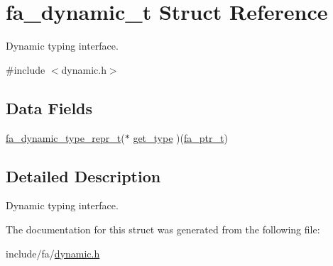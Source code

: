 \hypertarget{structfa__dynamic__t}{\section{fa\-\_\-dynamic\-\_\-t Struct Reference}
\label{structfa__dynamic__t}
}


Dynamic typing interface.  




{\ttfamily \#include $<$dynamic.\-h$>$}

\subsection*{Data Fields}
\begin{DoxyCompactItemize}
\item 
\hyperlink{group___fa_dynamic_ga38427e999172dad2684f07793859f416}{fa\-\_\-dynamic\-\_\-type\-\_\-repr\-\_\-t}($\ast$ \hyperlink{group___fa_ga71d83116cfc09ed22e0b785a0df2ef7f}{get\-\_\-type} )(\hyperlink{group___fa_ga915ddeae99ad7568b273d2b876425197}{fa\-\_\-ptr\-\_\-t})
\end{DoxyCompactItemize}


\subsection{Detailed Description}
Dynamic typing interface. 

The documentation for this struct was generated from the following file\-:\begin{DoxyCompactItemize}
\item 
include/fa/\hyperlink{dynamic_8h}{dynamic.\-h}\end{DoxyCompactItemize}
